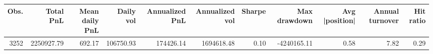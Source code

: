 \begin{tabular}{rrrrrrrrrrr}
\toprule
Obs. & Total PnL & Mean daily PnL & Daily vol & Annualized PnL & Annualized vol & Sharpe & Max drawdown & Avg |position| & Annual turnover & Hit ratio \\
\midrule
3252 & 2250927.79 & 692.17 & 106750.93 & 174426.14 & 1694618.48 & 0.10 & -4240165.11 & 0.58 & 7.82 & 0.29 \\
\bottomrule
\end{tabular}
